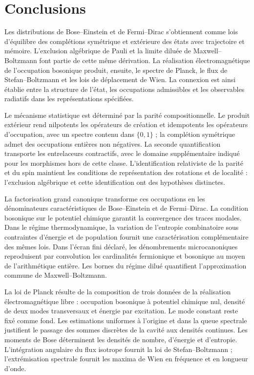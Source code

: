 \begingroup\fontsize{10}{11.8}\selectfont\setlength{\parskip}{2pt}
\section{Conclusions}
\label{v:conclusiones}
Les distributions de Bose--Einstein et de Fermi--Dirac s’obtiennent comme lois
d’équilibre des complétions symétrique et extérieure des états
avec trajectoire et mémoire. L’exclusion algébrique de Pauli et la limite
diluée de Maxwell--Boltzmann font partie de cette même dérivation.
La réalisation électromagnétique de l’occupation bosonique produit,
ensuite, le spectre de Planck, le flux de Stefan--Boltzmann et
les lois de déplacement de Wien. La connexion est ainsi établie
entre la structure de l’état, les occupations admissibles et les observables
radiatifs dans les représentations spécifiées.

Le mécanisme statistique est déterminé par la parité compositionnelle.
Le produit extérieur rend nilpotents les opérateurs de création et
idempotents les opérateurs d’occupation, avec un spectre contenu dans
\(\{0,1\}\) ; la complétion symétrique admet des occupations entières non
négatives. La seconde quantification transporte les entrelaceurs
contractifs, avec le domaine supplémentaire indiqué pour les morphismes
hors de cette classe. L’identification relativiste de la parité et du spin
maintient les conditions de représentation des rotations et de localité :
l’exclusion algébrique et cette identification ont des hypothèses distinctes.

La factorisation grand canonique transforme ces occupations en les
dénominateurs caractéristiques de Bose--Einstein et de Fermi--Dirac.
La condition bosonique sur le potentiel chimique garantit la
convergence des traces modales. Dans le régime thermodynamique, la
variation de l’entropie combinatoire sous contraintes d’énergie et de population
fournit une caractérisation complémentaire des mêmes lois.
Dans l’écran fini déclaré,
les dénombrements microcanoniques reproduisent par convolution les cardinalités
fermionique et bosonique au moyen de l’arithmétique entière. Les bornes du régime
dilué quantifient l’approximation commune de Maxwell--Boltzmann.

La loi de Planck résulte de la composition de trois données de la réalisation
électromagnétique libre : occupation bosonique à potentiel chimique nul,
densité de deux modes transversaux et énergie par excitation.
Le mode constant reste fixé comme fond. Les estimations
uniformes à l’origine et dans la queue spectrale justifient le passage des
sommes discrètes de la cavité aux densités continues. Les moments
de Bose déterminent les densités de nombre, d’énergie et d’entropie.
L’intégration angulaire du flux isotrope fournit la loi de
Stefan--Boltzmann ; l’extrémisation spectrale fournit les maxima
de Wien en fréquence et en longueur d’onde.

